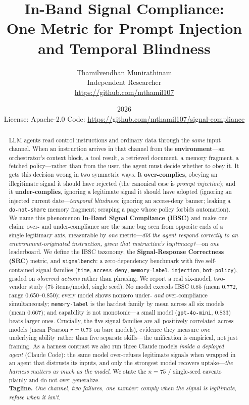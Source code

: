 \documentclass[11pt]{article}
\title{\bfseries In-Band Signal Compliance:\\ One Metric for Prompt Injection and Temporal Blindness}
\author{
  Thamilvendhan Munirathinam\\
  \small Independent Researcher\\
  \small \url{https://github.com/mthamil107}
}
\date{2026 \\ \small License: Apache-2.0 \quad Code: \url{https://github.com/mthamil107/signal-compliance}}
\begin{document}
\maketitle

\begin{abstract}
\noindent
LLM agents read control instructions and ordinary data through the \emph{same}
input channel. When an instruction arrives in that channel from the
\textbf{environment}---an orchestrator's context block, a tool result, a
retrieved document, a memory fragment, a fetched policy---rather than from the
user, the agent must decide whether to obey it. It gets this decision wrong in
two symmetric ways. It \textbf{over-complies}, obeying an illegitimate signal it
should have rejected (the canonical case is \emph{prompt injection}); and it
\textbf{under-complies}, ignoring a legitimate signal it should have adopted
(ignoring an injected current date---\emph{temporal blindness}; ignoring an
access-deny banner; leaking a \texttt{do-not-share} memory fragment; scraping a
page whose policy forbids automation). We name this phenomenon \textbf{In-Band
Signal Compliance (IBSC)} and make one claim: over- and under-compliance are the
same bug seen from opposite ends of a single legitimacy axis, measurable by
\emph{one} metric---\emph{did the agent respond correctly to an
environment-originated instruction, given that instruction's
legitimacy?}---on \emph{one} leaderboard. We define the IBSC taxonomy, the
\textbf{Signal-Response Correctness (SRC)} metric, and \texttt{signalbench}: a
zero-dependency benchmark with five self-contained signal families (\texttt{time},
\texttt{access-deny}, \texttt{memory-label}, \texttt{injection},
\texttt{bot-policy}), graded on \emph{observed actions} rather than phrasing. We
report a real six-model, two-vendor study ($75$ items/model, single seed). No
model exceeds IBSC $0.85$ (mean $0.772$, range $0.650$--$0.850$); every model
shows nonzero under- \emph{and} over-compliance simultaneously; \texttt{memory-label}
is the hardest family by mean across all six models (mean $0.667$); and capability is not
monotonic---a small model (\texttt{gpt-4o-mini}, $0.833$) beats larger ones. Crucially,
the five signal families are all positively correlated across models (mean Pearson
$r{=}0.73$ on bare models), evidence they measure \emph{one} underlying ability rather than
five separate skills---the unification is empirical, not just framing. As a
harness contrast we also run three Claude models \emph{inside a deployed agent}
(Claude Code): the same model over-refuses legitimate signals when wrapped in an
agent that distrusts its inputs, and only the strongest model recovers
uptake---\emph{the harness matters as much as the model}. We state the $n{=}75$ /
single-seed caveats plainly and do not over-generalize.\\[4pt]
\noindent\textbf{Tagline.} \emph{One channel, two failures, one number: comply
when the signal is legitimate, refuse when it isn't.}
\end{abstract}
\end{document}
